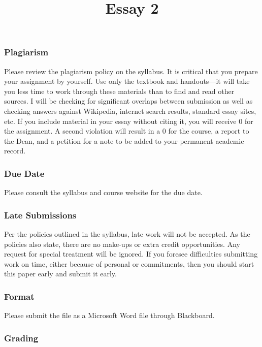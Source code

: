 \documentclass[]{article}
\title{Essay 2}
\date{}
\begin{document}
\maketitle

\subsubsection{Plagiarism}\label{plagiarism}

Please review the plagiarism policy on the syllabus. It is critical that
you prepare your assignment by yourself. Use only the textbook and
handouts---it will take you less time to work through these materials
than to find and read other sources. I will be checking for significant
overlaps between submission as well as checking answers against
Wikipedia, internet search results, standard essay sites, etc. If you
include material in your essay without citing it, you will receive 0 for
the assignment. A second violation will result in a 0 for the course, a
report to the Dean, and a petition for a note to be added to your
permanent academic record.

\subsubsection{Due Date}\label{due-date}

Please consult the syllabus and course website for the due date.

\subsubsection{Late Submissions}\label{late-submissions}

Per the policies outlined in the syllabus, late work will not be
accepted. As the policies also state, there are no make-ups or extra
credit opportunities. Any request for special treatment will be ignored.
If you foresee difficulties submitting work on time, either because of
personal or commitments, then you should start this paper early and
submit it early.

\subsubsection{Format}\label{format}

Please submit the file as a Microsoft Word file through Blackboard.

\subsubsection{Grading}\label{grading}
\end{document}
